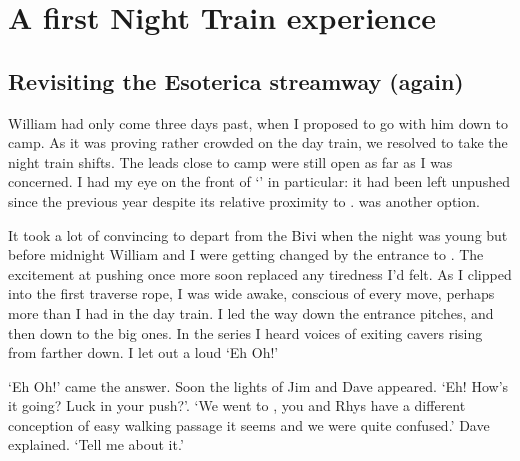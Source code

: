 \section{A first Night Train experience}

\subsection{Revisiting the Esoterica streamway (again)}
William had only come three days past, when I proposed to go with him down to camp. As it was proving rather crowded on the day train, we resolved to take the night train shifts. The leads close to camp were still open as far as I was concerned. I had my eye on the front of `' in particular: it had been left unpushed since the previous year despite its relative proximity to .  was another option.

It took a lot of convincing to depart from the Bivi when the night was young but before midnight William and I were getting changed by the entrance to . The excitement at pushing once more soon replaced any tiredness I'd felt. As I clipped into the first traverse rope, I was wide awake, conscious of every move, perhaps more than I had in the day train. I led the way down the entrance pitches, and then down to the big ones. In the   series I heard voices of exiting cavers rising from farther down. I let out a loud `Eh Oh!'

 `Eh Oh!' came the answer. Soon the lights of Jim and Dave appeared. `Eh! How's it going? Luck in your push?'.
`We went to , you and Rhys have a different conception of easy walking passage it seems and we were quite confused.' Dave explained.
`Tell me about it.'

